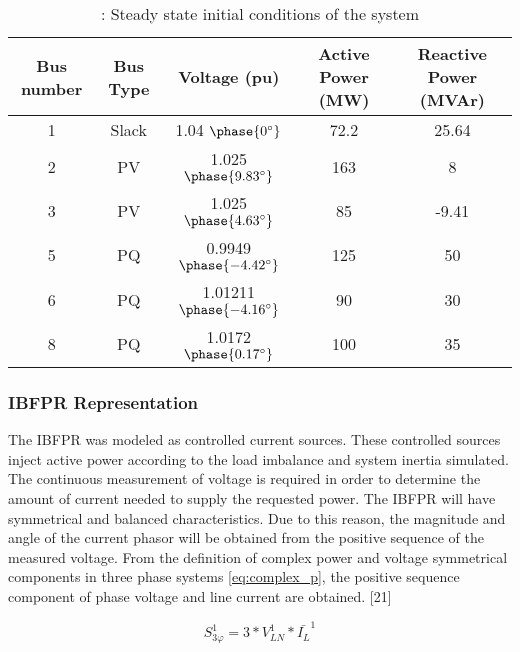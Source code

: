 \begin{table}[h]
	\caption{\label{tb:initial}: Steady state initial conditions of the system}
	\centering
	\begin{tabular}{ccccc}
		\toprule
		\textbf{Bus number}	& \textbf{Bus Type}	& \textbf{Voltage (pu)}& \textbf{Active Power (MW)}& \textbf{Reactive Power (MVAr)}\\
		\midrule
		1		& Slack			& 1.04 $\phase{0^{\circ}} $     &    72.2    & 25.64    \\
		2		& PV			& 1.025 $\phase{9.83^{\circ}} $      & 163      & 8     \\
		3		& PV			& 1.025 $\phase{4.63^{\circ}} $     & 85       &    -9.41 \\
		5		& PQ			& 0.9949 $\phase{-4.42^{\circ}} $       &125       &  50    \\
		6		& PQ			& 1.01211 $\phase{-4.16^{\circ}} $      &   90     &  30   \\
		8		& PQ			& 1.0172 $ \phase{0.17^{\circ}} $       &  100     &   35   \\
		
		\bottomrule
	\end{tabular}
\end{table}


\subsubsection{IBFPR Representation}


The IBFPR was modeled as controlled current sources. These controlled sources inject active power according to the load imbalance and system inertia simulated. The continuous measurement of voltage is required in order to determine the amount of current needed to supply the requested power. The IBFPR will have symmetrical and balanced characteristics. Due to this reason, the magnitude and angle of the current phasor will be obtained from the positive sequence of the measured voltage. From the definition of complex power and voltage symmetrical components in three phase systems \eqref{eq:complex_p}, the positive sequence component of phase voltage and line current are obtained. [21] 

\begin{equation}
\label{eq:complex_p}
S_{3\varphi}^1=3*V_{LN}^1*\bar{I_{L}}^1
\end{equation}

